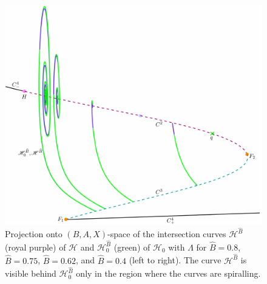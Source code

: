 \documentclass{ws-ijbc}
\begin{document}
\begin{figure}[t!]
\centering
\includegraphics[]{./figures/MKMO_20.pdf}
\caption{Projection onto $(B,A,X)$-space of the intersection curves $\mathscr{H}^{\widehat{B}}$ (royal purple) of $\mathscr{H}$ and $\mathscr{H}_0^{\widehat{B}}$ (green) of $\mathscr{H}_0$ with $\Lambda$ for $\widehat{B}=0.8$, $\widehat{B}=0.75$, $\widehat{B}=0.62$, and $\widehat{B}=0.4$ (left to right).  The curve $\mathscr{H}^{\widehat{B}}$ is visible behind $\mathscr{H}^{\widehat{B}}_0$ only in the region where the curves are spiralling.}
\label{figure_20}
\end{figure}
\end{document}
